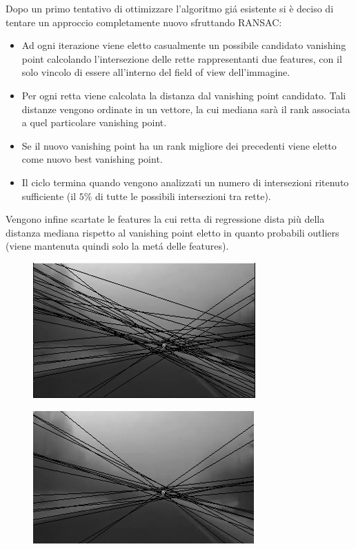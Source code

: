 \documentclass[12pt]{report}
\begin{document}
\noindent Dopo un primo tentativo di ottimizzare l'algoritmo gi\'a esistente si \`e deciso di tentare un approccio completamente nuovo sfruttando RANSAC:

\begin{itemize}
\item	Ad ogni iterazione viene eletto casualmente un possibile candidato vanishing point calcolando l'intersezione delle rette rappresentanti due features, con il solo vincolo di essere all'interno del field of view dell'immagine.
\item	Per ogni retta viene calcolata la distanza dal vanishing point candidato. Tali distanze vengono ordinate in un vettore, la cui mediana sar\`a il rank associata a quel particolare vanishing point.
\item	Se il nuovo vanishing point ha un rank migliore dei precedenti viene eletto come nuovo best vanishing point.
\item	Il ciclo termina quando vengono analizzati un numero di intersezioni ritenuto sufficiente (il $5\%$ di tutte le possibili intersezioni tra rette).
\end{itemize}

\noindent Vengono infine scartate le features la cui retta di regressione dista pi\`u della distanza mediana rispetto al vanishing point eletto in quanto probabili outliers (viene mantenuta quindi solo la met\'a delle features).

\begin{figure}
	\begin{minipage}[b]{0.5\linewidth}
		\centering
		\includegraphics[scale=0.6]{images/iaasBefore.png}
		\label{fig:vpBef}
	\end{minipage}
	\hspace{0.5cm}
	\begin{minipage}[b]{0.5\linewidth}
		\centering
		\includegraphics[scale=0.6]{images/iaasAfter.png}
		\label{fig:vpAft}
	\end{minipage}
\end{figure}
\end{document}
